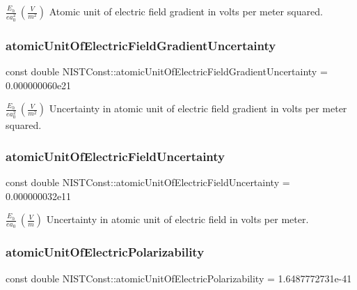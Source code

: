 $\frac{E_h}{e a_0^2}\ (\frac{V}{m^2})$ Atomic unit of electric field gradient in volts per meter squared. \mbox{\label{group___atomic_unit_gab460c44de9b3fd957cd959cce3545631}} 
\subsubsection{\texorpdfstring{atomic\+Unit\+Of\+Electric\+Field\+Gradient\+Uncertainty}{atomicUnitOfElectricFieldGradientUncertainty}}
{\footnotesize\ttfamily const double N\+I\+S\+T\+Const\+::atomic\+Unit\+Of\+Electric\+Field\+Gradient\+Uncertainty = 0.\+000000060e21}

$\frac{E_h}{e a_0^2}\ (\frac{V}{m^2})$ Uncertainty in atomic unit of electric field gradient in volts per meter squared. \mbox{\label{group___atomic_unit_ga12048ba2381ea4da6842027fd918b6d0}} 
\subsubsection{\texorpdfstring{atomic\+Unit\+Of\+Electric\+Field\+Uncertainty}{atomicUnitOfElectricFieldUncertainty}}
{\footnotesize\ttfamily const double N\+I\+S\+T\+Const\+::atomic\+Unit\+Of\+Electric\+Field\+Uncertainty = 0.\+000000032e11}

$\frac{E_h}{e a_0} \ (\frac{V}{m})$ Uncertainty in atomic unit of electric field in volts per meter. \mbox{\label{group___atomic_unit_ga5809393ec8d30cbb7e0c7a2f168e48ec}} 
\subsubsection{\texorpdfstring{atomic\+Unit\+Of\+Electric\+Polarizability}{atomicUnitOfElectricPolarizability}}
{\footnotesize\ttfamily const double N\+I\+S\+T\+Const\+::atomic\+Unit\+Of\+Electric\+Polarizability = 1.\+6487772731e-\/41}

